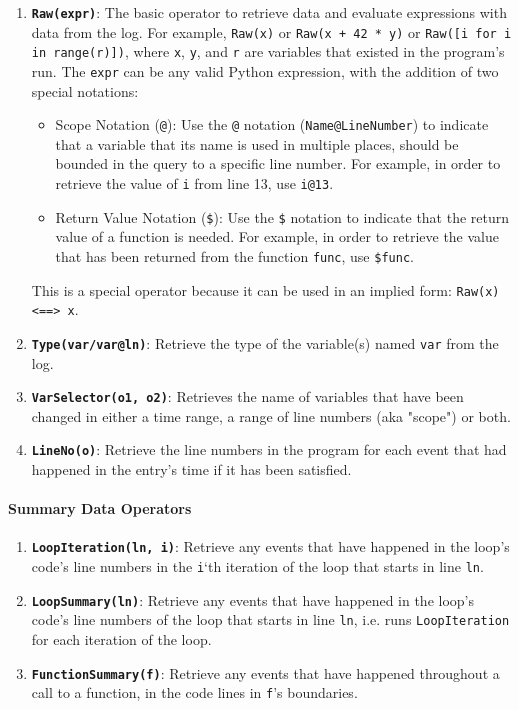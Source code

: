 \documentclass[sigconf,review]{acmart}
\begin{document}
    \begin{enumerate}
        \item \texttt{\textbf{Raw(expr)}}: The basic operator to retrieve data and evaluate expressions with data from the log.
        For example, \texttt{Raw(x)} or \texttt{Raw(x + 42 * y)} or \texttt{Raw([i for i in range(r)])}, where \texttt{x}, \texttt{y}, and \texttt{r} are variables that existed in the program's run.
        The \texttt{expr} can be any valid Python expression, with the addition of two special notations:
        \begin{itemize}
            \item Scope Notation (\texttt{@}): Use the \texttt{@} notation (\texttt{Name@LineNumber}) to indicate that a variable that its name is used in multiple places, should be bounded in the query to a specific line number. For example, in order to retrieve the value of \texttt{i} from line 13, use \texttt{i@13}.
            \item Return Value Notation (\texttt{\$}): Use the \texttt{\$} notation to indicate that the return value of a function is needed. For example, in order to retrieve the value that has been returned from the function \texttt{func}, use \texttt{\$func}.
        \end{itemize}
        This is a special operator because it can be used in an implied form: \texttt{Raw(x) <==> x}.
        \item \texttt{\textbf{Type(var/var@ln)}}: Retrieve the type of the variable(s) named \texttt{var} from the log.
        \item \texttt{\textbf{VarSelector(o1, o2)}}: Retrieves the name of variables that have been changed in either a time range, a range of line numbers (aka "scope") or both.
        \item \texttt{\textbf{LineNo(o)}}: Retrieve the line numbers in the program for each event that had happened in the entry's time if it has been satisfied.
    \end{enumerate}

    \paragraph{Summary Data Operators}
    \begin{enumerate}
        \item \texttt{\textbf{LoopIteration(ln, i)}}: Retrieve any events that have happened in the loop's code's line numbers in the \texttt{i}`th iteration of the loop that starts in line \texttt{ln}.
        \item \texttt{\textbf{LoopSummary(ln)}}: Retrieve any events that have happened in the loop's code's line numbers of the loop that starts in line \texttt{ln}, i.e. runs \texttt{LoopIteration} for each iteration of the loop.
        \item \texttt{\textbf{FunctionSummary(f)}}: Retrieve any events that have happened throughout a call to a function, in the code lines in \texttt{f}'s boundaries.
    \end{enumerate}
\end{document}
